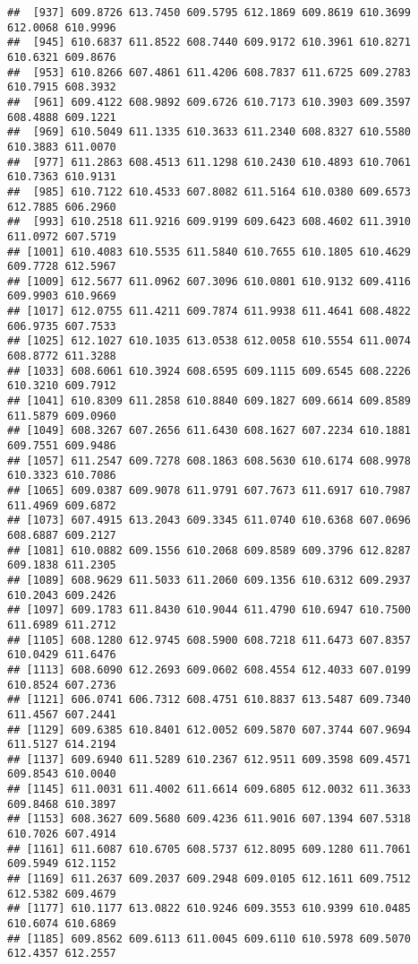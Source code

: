 \documentclass[
]{article}
\begin{document}
\begin{verbatim}
##  [937] 609.8726 613.7450 609.5795 612.1869 609.8619 610.3699 612.0068 610.9996
##  [945] 610.6837 611.8522 608.7440 609.9172 610.3961 610.8271 610.6321 609.8676
##  [953] 610.8266 607.4861 611.4206 608.7837 611.6725 609.2783 610.7915 608.3932
##  [961] 609.4122 608.9892 609.6726 610.7173 610.3903 609.3597 608.4888 609.1221
##  [969] 610.5049 611.1335 610.3633 611.2340 608.8327 610.5580 610.3883 611.0070
##  [977] 611.2863 608.4513 611.1298 610.2430 610.4893 610.7061 610.7363 610.9131
##  [985] 610.7122 610.4533 607.8082 611.5164 610.0380 609.6573 612.7885 606.2960
##  [993] 610.2518 611.9216 609.9199 609.6423 608.4602 611.3910 611.0972 607.5719
## [1001] 610.4083 610.5535 611.5840 610.7655 610.1805 610.4629 609.7728 612.5967
## [1009] 612.5677 611.0962 607.3096 610.0801 610.9132 609.4116 609.9903 610.9669
## [1017] 612.0755 611.4211 609.7874 611.9938 611.4641 608.4822 606.9735 607.7533
## [1025] 612.1027 610.1035 613.0538 612.0058 610.5554 611.0074 608.8772 611.3288
## [1033] 608.6061 610.3924 608.6595 609.1115 609.6545 608.2226 610.3210 609.7912
## [1041] 610.8309 611.2858 610.8840 609.1827 609.6614 609.8589 611.5879 609.0960
## [1049] 608.3267 607.2656 611.6430 608.1627 607.2234 610.1881 609.7551 609.9486
## [1057] 611.2547 609.7278 608.1863 608.5630 610.6174 608.9978 610.3323 610.7086
## [1065] 609.0387 609.9078 611.9791 607.7673 611.6917 610.7987 611.4969 609.6872
## [1073] 607.4915 613.2043 609.3345 611.0740 610.6368 607.0696 608.6887 609.2127
## [1081] 610.0882 609.1556 610.2068 609.8589 609.3796 612.8287 609.1838 611.2305
## [1089] 608.9629 611.5033 611.2060 609.1356 610.6312 609.2937 610.2043 609.2426
## [1097] 609.1783 611.8430 610.9044 611.4790 610.6947 610.7500 611.6989 611.2712
## [1105] 608.1280 612.9745 608.5900 608.7218 611.6473 607.8357 610.0429 611.6476
## [1113] 608.6090 612.2693 609.0602 608.4554 612.4033 607.0199 610.8524 607.2736
## [1121] 606.0741 606.7312 608.4751 610.8837 613.5487 609.7340 611.4567 607.2441
## [1129] 609.6385 610.8401 612.0052 609.5870 607.3744 607.9694 611.5127 614.2194
## [1137] 609.6940 611.5289 610.2367 612.9511 609.3598 609.4571 609.8543 610.0040
## [1145] 611.0031 611.4002 611.6614 609.6805 612.0032 611.3633 609.8468 610.3897
## [1153] 608.3627 609.5680 609.4236 611.9016 607.1394 607.5318 610.7026 607.4914
## [1161] 611.6087 610.6705 608.5737 612.8095 609.1280 611.7061 609.5949 612.1152
## [1169] 611.2637 609.2037 609.2948 609.0105 612.1611 609.7512 612.5382 609.4679
## [1177] 610.1177 613.0822 610.9246 609.3553 610.9399 610.0485 610.6074 610.6869
## [1185] 609.8562 609.6113 611.0045 609.6110 610.5978 609.5070 612.4357 612.2557

\end{verbatim}
\end{document}
